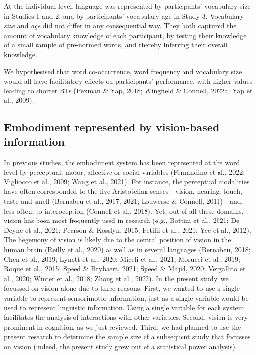 \documentclass[
  12pt,
  man,floatsintext]{apa7}
\begin{document}
At the individual level, language was represented by participants' vocabulary size in Studies 1 and 2, and by participants' vocabulary age in Study 3. Vocabulary \emph{size} and \emph{age} did not differ in any consequential way. They both captured the amount of vocabulary knowledge of each participant, by testing their knowledge of a small sample of pre-normed words, and thereby inferring their overall knowledge.

We hypothesised that word co-occurrence, word frequency and vocabulary size would all have facilitatory effects on participants' performance, with higher values leading to shorter RTs (Pexman \& Yap, 2018; Wingfield \& Connell, 2022a; Yap et al., 2009).

\hypertarget{embodiment-represented-by-vision-based-information}{%
\subsection{Embodiment represented by vision-based information}\label{embodiment-represented-by-vision-based-information}}

In previous studies, the embodiment system has been represented at the word level by perceptual, motor, affective or social variables (Fernandino et al., 2022; Vigliocco et al., 2009; Wang et al., 2021). For instance, the perceptual modalities have often corresponded to the five Aristotelian senses---vision, hearing, touch, taste and smell (Bernabeu et al., 2017, 2021; Louwerse \& Connell, 2011)---and, less often, to interoception (Connell et al., 2018). Yet, out of all these domains, vision has been most frequently used in research (e.g., Bottini et al., 2021; De Deyne et al., 2021; Pearson \& Kosslyn, 2015; Petilli et al., 2021; Yee et al., 2012). The hegemony of vision is likely due to the central position of vision in the human brain (Reilly et al., 2020) as well as in several languages (Bernabeu, 2018; Chen et al., 2019; Lynott et al., 2020; Miceli et al., 2021; Morucci et al., 2019; Roque et al., 2015; Speed \& Brybaert, 2021; Speed \& Majid, 2020; Vergallito et al., 2020; Winter et al., 2018; Zhong et al., 2022). In the present study, we focussed on vision alone due to three reasons. First, we wanted to use a single variable to represent sensorimotor information, just as a single variable would be used to represent linguistic information. Using a single variable for each system facilitates the analysis of interactions with other variables. Second, vision is very prominent in cognition, as we just reviewed. Third, we had planned to use the present research to determine the sample size of a subsequent study that focusses on vision (indeed, the present study grew out of a statistical power analysis).
\end{document}
